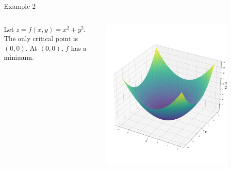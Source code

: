 \documentclass[aspectratio=169,xcolor=dvipsnames,svgnames,x11names,fleqn]{beamer}
\begin{document}
\begin{frame}{Example 2}
\begin{columns}
\begin{column}{0.5\linewidth}
    Let $z = f (x, y) = x^2 + y^2$. The only critical point is $(0, 0)$. At $(0, 0)$, $f$ has a minimum.
\end{column}
\begin{column}{0.5\linewidth}
    \begin{center}
    \includegraphics[width=0.85\textwidth]{figures/critical_point_ex2.png}
\end{center}
\end{column}
\end{columns}
\end{frame}
\end{document}
